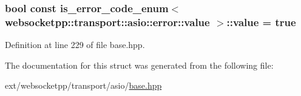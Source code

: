 \subsubsection[{value}]{\setlength{\rightskip}{0pt plus 5cm}bool const is\+\_\+error\+\_\+code\+\_\+enum$<$ {\bf websocketpp\+::transport\+::asio\+::error\+::value} $>$\+::value = true\hspace{0.3cm}{\ttfamily [static]}}\label{structis__error__code__enum_3_01websocketpp_1_1transport_1_1asio_1_1error_1_1value_01_4_aae5dbb38b63c54b30712a8d9437b4aeb}


Definition at line 229 of file base.\+hpp.



The documentation for this struct was generated from the following file\+:\begin{DoxyCompactItemize}
\item 
ext/websocketpp/transport/asio/\hyperlink{transport_2asio_2base_8hpp}{base.\+hpp}\end{DoxyCompactItemize}
